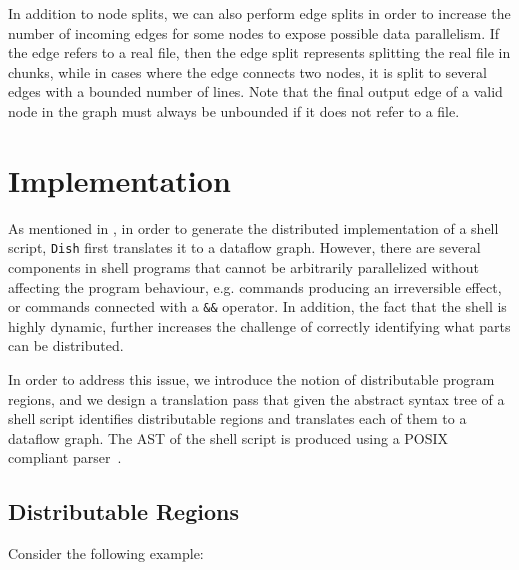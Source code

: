 \documentclass[sigplan,10pt,review,anonymous]{acmart}
\newcommand{\ttt}[1]{\texttt{\small #1}}
\newcommand{\kk}[1]{[{\color{magenta}#1 --- kk}]}
\begin{document}

In addition to node splits, we can also perform edge splits in order
to increase the number of incoming edges for some nodes to expose
possible data parallelism. If the edge refers to a real file, then the
edge split represents splitting the real file in chunks, while in
cases where the edge connects two nodes, it is split to several edges
with a bounded number of lines. Note that the final output edge of a
valid node in the graph must always be unbounded if it does not refer
to a file.





\section{Implementation}
\label{impl}

As mentioned in , in order to generate the distributed
implementation of a shell script, \ttt{Dish} first translates it to
a dataflow graph. However, there are several components in shell
programs that cannot be arbitrarily parallelized without affecting the
program behaviour, e.g. commands producing an irreversible effect, or
commands connected with a \ttt{\&\&} operator. In addition, the
fact that the shell is highly dynamic, further increases the
challenge of correctly identifying what parts can be distributed.


In order to address this issue, we introduce the notion of
distributable program regions, and we design a translation pass that
given the abstract syntax tree of a shell script identifies
distributable regions and translates each of them to a dataflow
graph. The AST of the shell script is produced using a POSIX compliant
parser~\cite{libdash}.

\subsection{Distributable Regions}


Consider the following example:
\end{document}

